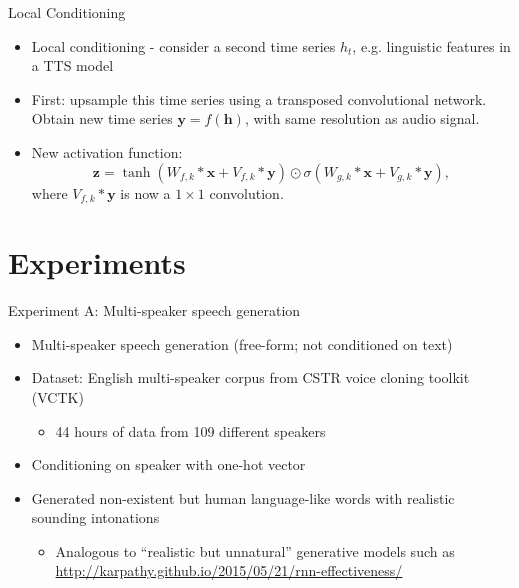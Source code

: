 \documentclass{beamer}
\begin{document}
  \begin{frame}{Local Conditioning}
    \begin{itemize}
      \item Local conditioning - consider a second time series $h_t$, e.g. linguistic features in a TTS model

      \item First: upsample this time series using a transposed convolutional network.  Obtain new time series $\mathbf{y} = f(\mathbf{h})$, with same resolution as audio signal.

      \item New activation function:
        \[
          \mathbf{z} = \tanh(W_{f, k} * \mathbf{x} + V_{f, k} * \mathbf{y}) \odot \sigma(W_{g, k} * \mathbf{x} + V_{g, k} * \mathbf{y}),
        \]
        where $V_{f, k} * \mathbf{y}$ is now a $1 \times 1$ convolution.
    \end{itemize}
  \end{frame}

  \section{Experiments}
  \begin{frame}{Experiment A: Multi-speaker speech generation}

    \begin{itemize}
      \item Multi-speaker speech generation (free-form; not conditioned on text)
      \item Dataset: English multi-speaker corpus from CSTR voice cloning toolkit (VCTK)
        \begin{itemize}
          \item 44 hours of data from 109 different speakers
        \end{itemize}
     \item Conditioning on speaker with one-hot vector  
      \item Generated non-existent but human language-like words with realistic sounding intonations
        \begin{itemize}
          \item Analogous to ``realistic but unnatural'' generative models such as \url{http://karpathy.github.io/2015/05/21/rnn-effectiveness/}
        \end{itemize}
    \end{itemize}
  \end{frame}
\end{document}
